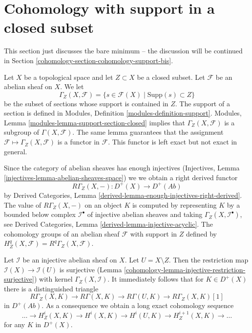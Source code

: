 \section{Cohomology with support in a closed subset}
\label{cohomology-section-cohomology-support}
This section just discusses the bare minimum -- the discussion
will be continued in Section \ref{cohomology-section-cohomology-support-bis}.

\medskip\noindent
Let $X$ be a topological space and let $Z \subset X$ be a closed subset.
Let $\mathcal{F}$ be an abelian sheaf on $X$. We let
$$
\Gamma_Z(X, \mathcal{F}) =
\{s \in \mathcal{F}(X) \mid \text{Supp}(s) \subset Z\}
$$
be the subset of sections whose support is contained in $Z$.
The support of a section is defined in
Modules, Definition \ref{modules-definition-support}.
Modules, Lemma \ref{modules-lemma-support-section-closed}
implies that $\Gamma_Z(X, \mathcal{F})$ is a subgroup of
$\Gamma(X, \mathcal{F})$. The same lemma guarantees that
the assignment $\mathcal{F} \mapsto \Gamma_Z(X, \mathcal{F})$
is a functor in $\mathcal{F}$.
This functor is left exact but not exact in general.

\medskip\noindent
Since the category of abelian sheaves has enough injectives
(Injectives, Lemma \ref{injectives-lemma-abelian-sheaves-space})
we we obtain a right derived functor
$$
R\Gamma_Z(X, -) : D^+(X) \longrightarrow D^+(\textit{Ab})
$$
by
Derived Categories, Lemma \ref{derived-lemma-enough-injectives-right-derived}.
The value of $R\Gamma_Z(X, -)$ on an object $K$ is computed by representing
$K$ by a bounded below complex $\mathcal{I}^\bullet$ of injective abelian
sheaves and taking $\Gamma_Z(X, \mathcal{I}^\bullet)$, see
Derived Categories, Lemma \ref{derived-lemma-injective-acyclic}.
The cohomology groups of an abelian sheaf $\mathcal{F}$
with support in $Z$ defined by
$H^q_Z(X, \mathcal{F}) = R^q\Gamma_Z(X, \mathcal{F})$.

\medskip\noindent
Let $\mathcal{I}$ be an injective abelian sheaf on $X$. Let
$U = X \setminus Z$. Then the restriction map
$\mathcal{I}(X) \to \mathcal{I}(U)$ is surjective
(Lemma \ref{cohomology-lemma-injective-restriction-surjective})
with kernel $\Gamma_Z(X, \mathcal{I})$. It immediately follows that
for $K \in D^+(X)$ there is a distinguished triangle
$$
R\Gamma_Z(X, K) \to R\Gamma(X, K) \to R\Gamma(U, K) \to R\Gamma_Z(X, K)[1]
$$
in $D^+(\textit{Ab})$. As a consequence we obtain a long exact cohomology
sequence
$$
\ldots \to H^i_Z(X, K) \to H^i(X, K) \to H^i(U, K) \to
H^{i + 1}_Z(X, K) \to \ldots
$$
for any $K$ in $D^+(X)$.

